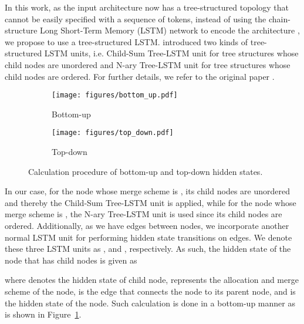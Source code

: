 \documentclass{article}
\begin{document}
In this work, as the input architecture now has a tree-structured topology that cannot be easily specified with a sequence of tokens, 
instead of using the chain-structure Long Short-Term Memory (LSTM) network \cite{hochreiter1997long} to encode the architecture \cite{zoph2017learning}, we propose to use a tree-structured LSTM. \citet{tai2015improved} introduced two kinds of tree-structured LSTM units, i.e. Child-Sum Tree-LSTM unit for tree structures whose child nodes are unordered and N-ary Tree-LSTM unit for tree structures whose child nodes are ordered. For further details, we refer to the original paper \cite{tai2015improved}.

\begin{figure}[t]
	\centering
\begin{subfigure}{0.46\linewidth}
		\centering
		\texttt{[image: figures/bottom\_up.pdf]}
		\vspace{-2pt}
		\caption{Bottom-up}
		\label{fig:encoder_bottom_up}
		\vspace{-0pt}
	\end{subfigure}
	\hfill
	\begin{subfigure}{0.46\linewidth}
		\centering
		\texttt{[image: figures/top\_down.pdf]}
		\vspace{-2pt}
		\caption{Top-down}
		\label{fig:encoder_top_down}
		\vspace{-0pt}
	\end{subfigure}	
	\caption{Calculation procedure of bottom-up and top-down hidden states.}
	\label{fig:tree_encoder}
\end{figure}

In our case, for the node whose merge scheme is , its child nodes are unordered and thereby the Child-Sum Tree-LSTM unit is applied, while for the node whose merge scheme is , the N-ary Tree-LSTM unit is used since its child nodes are ordered. Additionally, as we have edges between nodes, we incorporate another normal LSTM unit for performing hidden state transitions on edges. We denote these three LSTM units as ,  and , respectively. As such, the hidden state of the node that has  child nodes is given as
{\small

}where  denotes the hidden state
of  child node,  represents the allocation and merge scheme of the node,  is the edge that connects the node to its parent node, and  is the hidden state of the node. Such calculation is done in a bottom-up manner as is shown in Figure~\ref{fig:encoder_bottom_up}.
\end{document}
